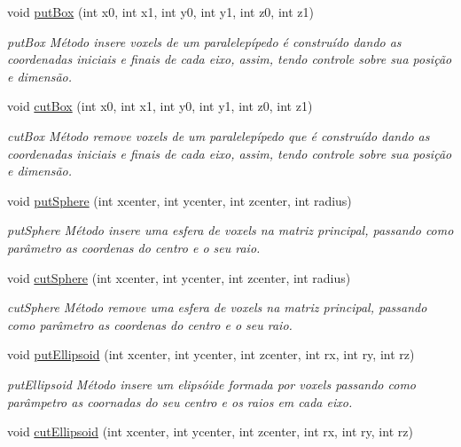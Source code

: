 \begin{DoxyCompactItemize}
void \mbox{\hyperlink{classsculptor3d_a33ad346684939cacea6c469afad99ffd}{put\+Box}} (int x0, int x1, int y0, int y1, int z0, int z1)
\begin{DoxyCompactList}\small\item\em put\+Box Método insere voxels de um paralelepípedo é construído dando as coordenadas iniciais e finais de cada eixo, assim, tendo controle sobre sua posição e dimensão. \end{DoxyCompactList}\item 
void \mbox{\hyperlink{classsculptor3d_ac92f60c7e3fd6ec3df820ddd118d7918}{cut\+Box}} (int x0, int x1, int y0, int y1, int z0, int z1)
\begin{DoxyCompactList}\small\item\em cut\+Box Método remove voxels de um paralelepípedo que é construído dando as coordenadas iniciais e finais de cada eixo, assim, tendo controle sobre sua posição e dimensão. \end{DoxyCompactList}\item 
void \mbox{\hyperlink{classsculptor3d_a81b399736b253ef298e7cf04feed9607}{put\+Sphere}} (int xcenter, int ycenter, int zcenter, int radius)
\begin{DoxyCompactList}\small\item\em put\+Sphere Método insere uma esfera de voxels na matriz principal, passando como parâmetro as coordenas do centro e o seu raio. \end{DoxyCompactList}\item 
void \mbox{\hyperlink{classsculptor3d_a1e8bf7a173f21c6fd805291ae76e94e8}{cut\+Sphere}} (int xcenter, int ycenter, int zcenter, int radius)
\begin{DoxyCompactList}\small\item\em cut\+Sphere Método remove uma esfera de voxels na matriz principal, passando como parâmetro as coordenas do centro e o seu raio. \end{DoxyCompactList}\item 
void \mbox{\hyperlink{classsculptor3d_a0dbd7e2f4ad70f379a38678df1fe7583}{put\+Ellipsoid}} (int xcenter, int ycenter, int zcenter, int rx, int ry, int rz)
\begin{DoxyCompactList}\small\item\em put\+Ellipsoid Método insere um elipsóide formada por voxels passando como parâmpetro as coornadas do seu centro e os raios em cada eixo. \end{DoxyCompactList}\item 
void \mbox{\hyperlink{classsculptor3d_ab65ed666a86d01f428d6f735ad860cc6}{cut\+Ellipsoid}} (int xcenter, int ycenter, int zcenter, int rx, int ry, int rz)

\end{DoxyCompactItemize}
